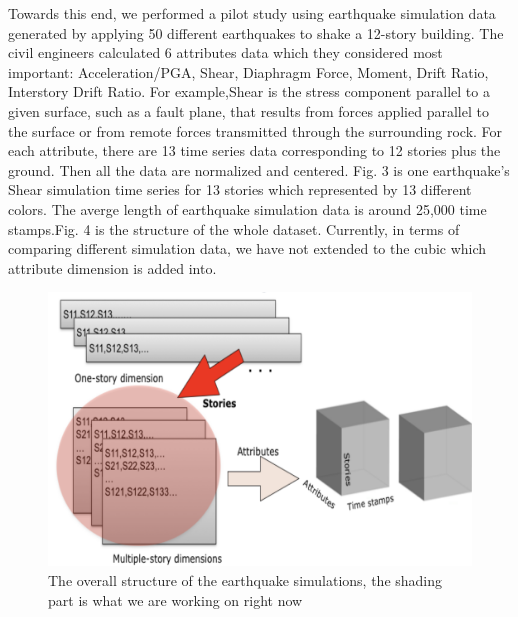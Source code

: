 Towards this end, we performed a pilot study using  earthquake simulation data generated by applying 50 different earthquakes to shake a 12-story building. The civil engineers calculated 6 attributes data which they considered most important: Acceleration/PGA, Shear, Diaphragm Force, Moment, Drift Ratio, Interstory Drift Ratio. For example,Shear is the stress component parallel to a given surface, such as a fault plane, that results from forces applied parallel to the surface or from remote forces transmitted through the surrounding rock. For each attribute, there are 13 time series data corresponding to 12 stories plus the ground. Then all the data are normalized and centered. Fig. 3 is one earthquake's Shear simulation time series for 13 stories which represented by 13 different colors.  The averge length of earthquake simulation data is around 25,000 time stamps.Fig. 4 is the structure of the whole dataset. Currently, in terms of comparing different simulation data, we have not extended to the cubic  which attribute dimension is added into.
\begin{figure}[h]
	\centering %
	\includegraphics[width=\columnwidth]{figs/structure} 
	\caption{The overall structure of the earthquake simulations, the shading part is what we are working on right now}
	\label{fig:data}
\end{figure}


